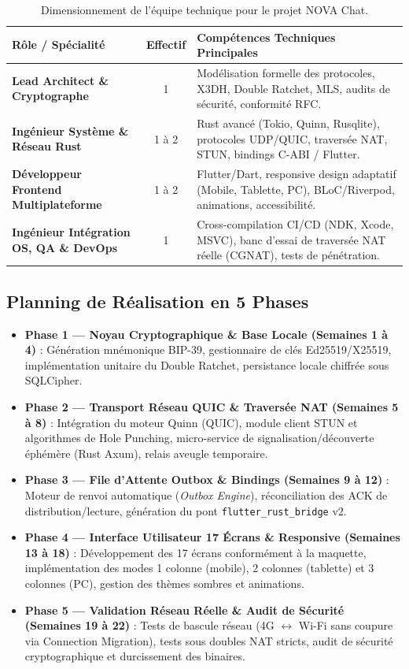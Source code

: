 \documentclass[11pt,a4paper]{article}
\begin{document}
\begin{table}[h!]
\centering
\begin{tabularx}{\textwidth}{|l|c|X|}
\hline
\rowcolor{novasurface2!20} \textbf{Rôle / Spécialité} & \textbf{Effectif} & \textbf{Compétences Techniques Principales} \\ \hline
\textbf{Lead Architect \& Cryptographe} & 1 & Modélisation formelle des protocoles, X3DH, Double Ratchet, MLS, audits de sécurité, conformité RFC. \\ \hline
\textbf{Ingénieur Système \& Réseau Rust} & 1 à 2 & Rust avancé (Tokio, Quinn, Rusqlite), protocoles UDP/QUIC, traversée NAT, STUN, bindings C-ABI / Flutter. \\ \hline
\textbf{Développeur Frontend Multiplateforme} & 1 à 2 & Flutter/Dart, responsive design adaptatif (Mobile, Tablette, PC), BLoC/Riverpod, animations, accessibilité. \\ \hline
\textbf{Ingénieur Intégration OS, QA \& DevOps} & 1 & Cross-compilation CI/CD (NDK, Xcode, MSVC), banc d'essai de traversée NAT réelle (CGNAT), tests de pénétration. \\ \hline
\end{tabularx}
\caption{Dimensionnement de l'équipe technique pour le projet NOVA Chat.}
\end{table}

\subsection{Planning de Réalisation en 5 Phases}

\begin{itemize}[leftmargin=1.2cm]
    \item \textbf{Phase 1 — Noyau Cryptographique \& Base Locale (Semaines 1 à 4)} :
    Génération mnémonique BIP-39, gestionnaire de clés Ed25519/X25519, implémentation unitaire du Double Ratchet, persistance locale chiffrée sous SQLCipher.
    \item \textbf{Phase 2 — Transport Réseau QUIC \& Traversée NAT (Semaines 5 à 8)} :
    Intégration du moteur Quinn (QUIC), module client STUN et algorithmes de Hole Punching, micro-service de signalisation/découverte éphémère (Rust Axum), relais aveugle temporaire.
    \item \textbf{Phase 3 — File d'Attente Outbox \& Bindings (Semaines 9 à 12)} :
    Moteur de renvoi automatique (\textit{Outbox Engine}), réconciliation des ACK de distribution/lecture, génération du pont \texttt{flutter\_rust\_bridge} v2.
    \item \textbf{Phase 4 — Interface Utilisateur 17 Écrans \& Responsive (Semaines 13 à 18)} :
    Développement des 17 écrans conformément à la maquette, implémentation des modes 1 colonne (mobile), 2 colonnes (tablette) et 3 colonnes (PC), gestion des thèmes sombres et animations.
    \item \textbf{Phase 5 — Validation Réseau Réelle \& Audit de Sécurité (Semaines 19 à 22)} :
    Tests de bascule réseau (4G $\leftrightarrow$ Wi-Fi sans coupure via Connection Migration), tests sous doubles NAT stricts, audit de sécurité cryptographique et durcissement des binaires.
\end{itemize}
\end{document}
